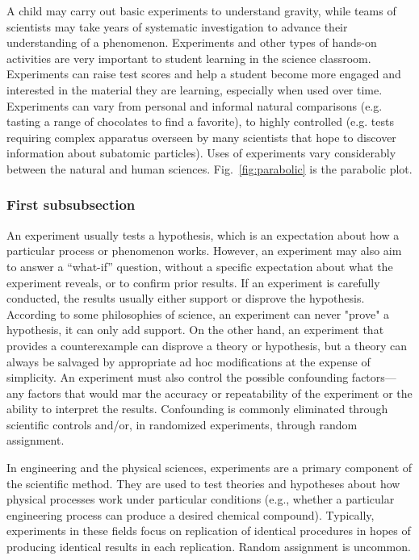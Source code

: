 \documentclass[11pt, a4paper]{article}
\begin{document}
A child may carry out basic experiments to understand gravity, while teams of scientists may take years of systematic investigation to advance their understanding of a phenomenon. Experiments and other types of hands-on activities are very important to student learning in the science classroom. Experiments can raise test scores and help a student become more engaged and interested in the material they are learning, especially when used over time. Experiments can vary from personal and informal natural comparisons (e.g. tasting a range of chocolates to find a favorite), to highly controlled (e.g. tests requiring complex apparatus overseen by many scientists that hope to discover information about subatomic particles). Uses of experiments vary considerably between the natural and human sciences. Fig.~\ref{fig:parabolic} is the parabolic plot.


\subsubsection{First subsubsection}
An experiment usually tests a hypothesis, which is an expectation about how a particular process or phenomenon works. However, an experiment may also aim to answer a ``what-if'' question, without a specific expectation about what the experiment reveals, or to confirm prior results. If an experiment is carefully conducted, the results usually either support or disprove the hypothesis. According to some philosophies of science, an experiment can never "prove" a hypothesis, it can only add support. On the other hand, an experiment that provides a counterexample can disprove a theory or hypothesis, but a theory can always be salvaged by appropriate ad hoc modifications at the expense of simplicity. An experiment must also control the possible confounding factors—any factors that would mar the accuracy or repeatability of the experiment or the ability to interpret the results. Confounding is commonly eliminated through scientific controls and/or, in randomized experiments, through random assignment.

In engineering and the physical sciences, experiments are a primary component of the scientific method. They are used to test theories and hypotheses about how physical processes work under particular conditions (e.g., whether a particular engineering process can produce a desired chemical compound). Typically, experiments in these fields focus on replication of identical procedures in hopes of producing identical results in each replication. Random assignment is uncommon.
\end{document}

